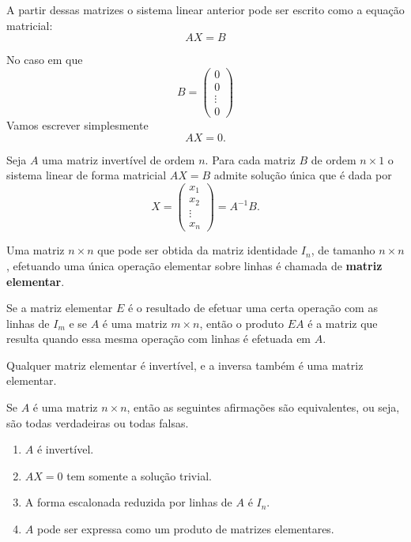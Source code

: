 A partir dessas matrizes o sistema linear anterior pode ser escrito como a equação matricial:
\[
    AX = B
\]

No caso em que
\[
    B = \begin{pmatrix}
        0\\0\\\vdots\\0
    \end{pmatrix}
\]
Vamos escrever simplesmente
\[
    AX = 0.
\]

\begin{teorema}
    Seja $A$ uma matriz invertível de ordem $n$. Para cada matriz $B$ de ordem $n\times 1$ o sistema linear de forma matricial
    $AX = B$ admite solução única que é dada por
    \[
        X = \begin{pmatrix}
            x_1 \\ x_2 \\ \vdots \\ x_n
        \end{pmatrix} = A^{-1}B.
    \]
\end{teorema}

\begin{definicao}
    Uma matriz $n\times n$ que pode ser obtida da matriz identidade $I_n$, de tamanho $n\times n$, efetuando uma 
    única operação elementar sobre linhas é chamada de \textbf{matriz elementar}.
\end{definicao}

\begin{teorema}
    Se a matriz elementar $E$ é o resultado de efetuar uma certa operação com as linhas de $I_m$ e se $A$ é uma matriz 
    $m \times n$, então o produto $EA$ é a matriz que resulta quando essa mesma operação com linhas é efetuada em $A$.
\end{teorema}

\begin{teorema}
    Qualquer matriz elementar é invertível, e a inversa também é uma matriz elementar.
\end{teorema}

\begin{teorema}
    Se $A$ é uma matriz $n \times n$, então as seguintes afirmações são equivalentes, ou seja, são todas verdadeiras  
    ou todas falsas.
    \begin{enumerate}[label={\roman*})]
        \item $A$ é invertível.
        
        \item $AX = 0$ tem somente a solução trivial.

        \item A forma escalonada reduzida por linhas de $A$ é $I_n$.

        \item $A$ pode ser expressa como um produto de matrizes elementares.
    \end{enumerate}
\end{teorema}
